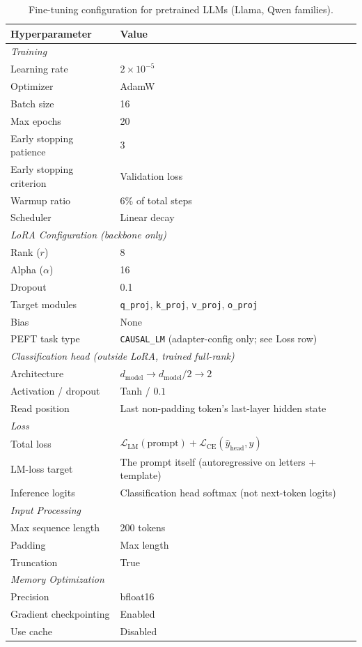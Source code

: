 \documentclass{article}
\theoremstyle{plain}
\theoremstyle{definition}
\theoremstyle{remark}
\begin{document}
\begin{table}[h]
\centering
\caption{Fine-tuning configuration for pretrained LLMs (Llama, Qwen families).}
\label{tab:llm_config}
\begin{tabular}{ll}
\toprule
Hyperparameter & Value \\
\midrule
\multicolumn{2}{l}{\textit{Training}} \\
Learning rate & $2 \times 10^{-5}$ \\
Optimizer & AdamW \\
Batch size & 16 \\
Max epochs & 20 \\
Early stopping patience & 3 \\
Early stopping criterion & Validation loss \\
Warmup ratio & 6\% of total steps \\
Scheduler & Linear decay \\
\midrule
\multicolumn{2}{l}{\textit{LoRA Configuration (backbone only)}} \\
Rank ($r$) & 8 \\
Alpha ($\alpha$) & 16 \\
Dropout & 0.1 \\
Target modules & \texttt{q\_proj}, \texttt{k\_proj}, \texttt{v\_proj}, \texttt{o\_proj} \\
Bias & None \\
PEFT task type & \texttt{CAUSAL\_LM} (adapter-config only; see Loss row) \\
\midrule
\multicolumn{2}{l}{\textit{Classification head (outside LoRA, trained full-rank)}} \\
Architecture & $d_{\text{model}} \to d_{\text{model}}/2 \to 2$ \\
Activation / dropout & Tanh / $0.1$ \\
Read position & Last non-padding token's last-layer hidden state \\
\midrule
\multicolumn{2}{l}{\textit{Loss}} \\
Total loss & $\mathcal{L}_{\text{LM}}(\text{prompt}) + \mathcal{L}_{\text{CE}}(\hat{y}_{\text{head}}, y)$ \\
LM-loss target & The prompt itself (autoregressive on letters + template) \\
Inference logits & Classification head softmax (not next-token logits) \\
\midrule
\multicolumn{2}{l}{\textit{Input Processing}} \\
Max sequence length & 200 tokens \\
Padding & Max length \\
Truncation & True \\
\midrule
\multicolumn{2}{l}{\textit{Memory Optimization}} \\
Precision & bfloat16 \\
Gradient checkpointing & Enabled \\
Use cache & Disabled \\
\bottomrule
\end{tabular}
\end{table}
\end{document}
